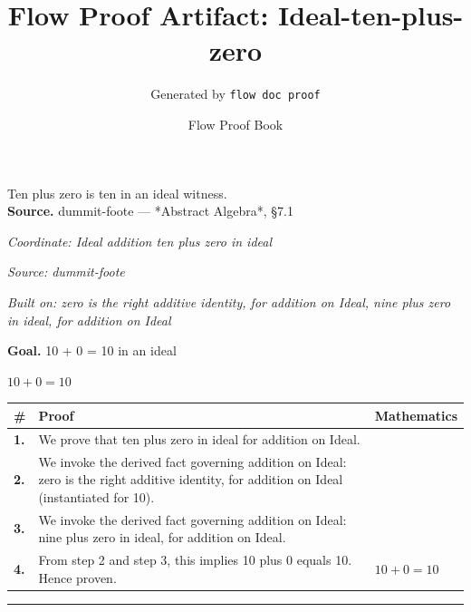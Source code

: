 \documentclass[11pt]{article}
\title{Flow Proof Artifact: Ideal-ten-plus-zero}
\author{Generated by \texttt{flow doc proof}}
\date{Flow Proof Book}
\theoremstyle{definition}
\begin{document}
\maketitle
Ten plus zero is ten in an ideal witness.\\[0.5em]
\textbf{Source.} dummit-foote — *Abstract Algebra*, §7.1\\[0.5em]
\bigskip
{}\par
\smallskip\noindent\textit{Coordinate: Ideal \cdot addition \cdot ten plus zero in ideal}\par
\smallskip\noindent\textit{Source: dummit-foote}\par
\smallskip\noindent\textit{Built on: zero is the right additive identity, for addition on Ideal, nine plus zero in ideal, for addition on Ideal}\par
\medskip
\noindent\textbf{Goal.} 10 + 0 = 10 in an ideal\par
\noindent$\displaystyle 10 + 0 = 10$\par
\medskip
\noindent
\begin{tabular}{@{} >{\raggedright\arraybackslash}p{} >{\raggedright\arraybackslash}p{} >{\raggedleft\arraybackslash}p{} @{}}
\textbf{\#} & \textbf{Proof} & \textbf{Mathematics} \\
\midrule
\textbf{1.} & We prove that ten plus zero in ideal for addition on Ideal. & \\[0.45em]
\textbf{2.} & We invoke the derived fact governing addition on Ideal: zero is the right additive identity, for addition on Ideal (instantiated for 10). & \\[0.45em]
\textbf{3.} & We invoke the derived fact governing addition on Ideal: nine plus zero in ideal, for addition on Ideal. & \\[0.45em]
\textbf{4.} & From step 2 and step 3, this implies 10 plus 0 equals 10. Hence proven. & $\displaystyle 10 + 0 = 10$ \\[0.45em]
\bottomrule
\end{tabular}
\label{thm:Ideal-addition-ten_plus_zero_in_ideal}
\par\medskip\hrule
\end{document}
